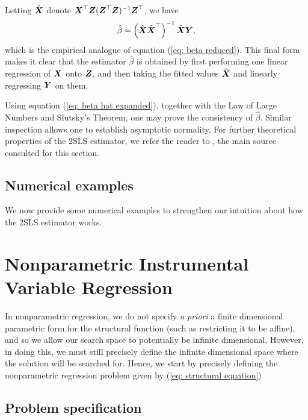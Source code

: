 Letting $ \hat{ \boldsymbol X } $ denote $ \boldsymbol X^{ \top } \boldsymbol Z ( \boldsymbol Z^{ \top } \boldsymbol Z )^{ -1 } \boldsymbol Z^{ \top } $, we have
\begin{equation*}
    \hat{ \beta } = \left( \hat{ \boldsymbol X } \hat{ \boldsymbol X }^{ \top } \right)^{ -1 } \hat{ \boldsymbol X } \boldsymbol Y 
,\end{equation*}
which is the empirical analogue of equation (\ref{eq: beta reduced}).
This final form makes it clear that the estimator $ \hat{ \beta } $ is obtained by first performing one linear regression of $ \boldsymbol X $ onto $ \boldsymbol Z $, and then taking the fitted values $ \hat{ \boldsymbol X } $ and linearly regressing $ \boldsymbol Y $ on them.

Using equation (\ref{eq: beta hat expanded}), together with the Law of Large Numbers and Slutsky's Theorem, one may prove the consistency of $ \hat{ \beta } $.
Similar inspection allows one to establish asymptotic normality.
For further theoretical properties of the 2SLS estimator, we refer the reader to \cite[Chapter~5]{wooldridge2001}, the main source consulted for this section.

\subsection{Numerical examples}

We now provide some numerical examples to strengthen our intuition about how the 2SLS estimator works.

\section{Nonparametric Instrumental Variable Regression}
\label{sec: nonparametric}

In nonparametric regression, we do not specify \emph{a priori} a finite dimensional parametric form for the structural function (such as restricting it to be affine), and so we allow our search space to potentially be infinite dimensional.
However, in doing this, we must still precisely define the infinite dimensional space where the solution will be searched for.
Hence, we start by precisely defining the nonparametric regression problem given by (\ref{eq: structural equation})

\subsection{Problem specification}
\label{sec: problem specification}

